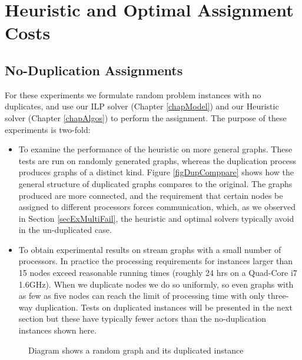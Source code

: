 \section{Heuristic and Optimal Assignment Costs}

\subsection{No-Duplication Assignments}

For these experiments we formulate random problem instances with no duplicates, and use our ILP solver (Chapter \ref{chapModel}) and our Heuristic solver (Chapter \ref{chapAlgos}) to perform the assignment.
The purpose of these experiments is two-fold:
\begin{itemize}
	\item To examine the performance of the heuristic on more general graphs.
			These tests are run on randomly generated graphs, whereas the duplication process produces graphs of a distinct kind.
			Figure \ref{figDupComppare} shows how the general structure of duplicated graphs compares to the original.
			The graphs produced are more connected, and the requirement that certain nodes be assigned to different processors forces communication, which, as we observed in Section \ref{secExMultiFail}, the heuristic and optimal solvers typically avoid in the un-duplicated case.
	\item To obtain experimental results on stream graphs with a small number of processors.
			In practice the processing requirements for instances larger than 15 nodes exceed reasonable running times (roughly 24 hrs on a Quad-Core i7 1.6GHz).
			When we duplicate nodes we do so uniformly, so even graphs with as few as five nodes can reach the limit of processing time with only three-way duplication.
			Tests on duplicated instances will be presented in the next section but these have typically fewer actors than the no-duplication instances shown here.
\end{itemize}


\begin{figure}
\begin{center}
	
\caption{Diagram shows a random graph and its duplicated instance}
\label{figDupCompare}
\end{center}
\end{figure}

